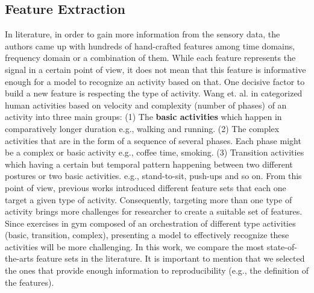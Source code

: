 \documentclass[journal,article,submit,moreauthors,pdftex]{Definitions/mdpi}
\begin{document}
\subsection{Feature Extraction}
In literature, in order to gain more information from the sensory data, the authors came up with hundreds of hand-crafted features among time domains, frequency domain or a combination of them. While each feature represents the signal in a certain point of view, it does not mean that this feature is informative enough for a model to recognize an activity based on that. One decisive factor to build a new feature is respecting the type of activity. Wang et. al. in \cite{wang2019survey} categorized human activities based on velocity and complexity (number of phases) of an activity into three main groups: (1) The \textbf{basic activities} which happen in comparatively longer duration e.g., walking and running. (2)  The complex activities that are in the form of a sequence of several phases. Each phase might be a complex or basic activity e.g., coffee time, smoking. (3) Transition activities which having a certain but temporal pattern happening between two different postures or two basic activities. e.g., stand-to-sit, push-ups and so on. From this point of view, previous works introduced  different feature sets that each one target a given type of activity. Consequently, targeting more than one type of activity brings more challenges for researcher to create a suitable set of features. Since exercises in gym composed of an orchestration of different type activities (basic, transition, complex), presenting a model to effectively recognize these activities will be more challenging. In this work, we compare the most state-of-the-arts feature sets in the literature. It is important to mention that we selected the ones that provide enough information to reproducibility (e.g., the definition of the features).
\end{document}
